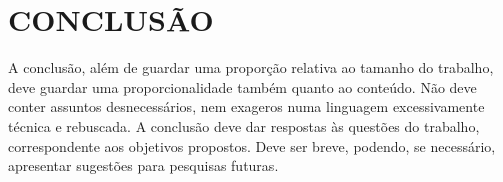 \documentclass[a4paper,12pt]{article}
\begin{document}
\pagebreak
\newpage


\thispagestyle{main}

\section{CONCLUSÃO}

\hspace{4ex}A conclusão, além de guardar uma proporção relativa ao tamanho do trabalho,
deve guardar uma proporcionalidade também quanto ao conteúdo. Não deve conter
assuntos desnecessários, nem exageros numa linguagem excessivamente técnica e
rebuscada. A conclusão deve dar respostas às questões do trabalho, correspondente aos
objetivos propostos. Deve ser breve, podendo, se necessário, apresentar sugestões para
pesquisas futuras.
\newpage




\appendix


\end{document}
